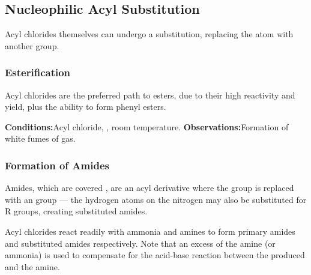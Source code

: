 


		\subsection{Nucleophilic Acyl Substitution}

			Acyl chlorides themselves can undergo a substitution, replacing the \ch{\Cl} atom with another group.

			\subsubsection{Esterification}

				Acyl chlorides are the preferred path to esters, due to their high reactivity and yield, plus the ability to form
				phenyl esters.

				\vspace{1.5em}
				\vbox{\textbf{Conditions:}\tabto{35mm}Acyl chloride, , room temperature.}
				\vbox{\textbf{Observations:}\tabto{35mm}Formation of white fumes of  gas.}





			\pagebreak
			\hypertarget{AcylChloridesReactionWithAmines}{}
			\subsubsection{Formation of Amides}

				Amides, which are covered \hyperlink{ChapterAmides}{}, are an acyl derivative where the  group
				is replaced with an  group --- the hydrogen atoms on the nitrogen may also be substituted for R groups, creating
				substituted amides.

				Acyl chlorides react readily with ammonia and amines to form primary amides and substituted amides respectively. Note that an
				excess of the amine (or ammonia) is used to compensate for the acid-base reaction between the  produced and the
				amine.

